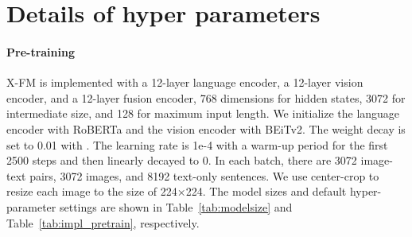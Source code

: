 \documentclass[11pt]{article}
\newcommand{\ModelNameB}{X-FM\xspace}
\begin{document}
\section{Details of hyper parameters}
\label{appendix:details_of_hyper_params}

\paragraph{Pre-training} 
{\ModelNameB} is implemented with a 12-layer language encoder, a 12-layer vision encoder, and a 12-layer fusion encoder, 768 dimensions for hidden states, 3072 for intermediate size, and 128 for maximum input length.
We initialize the language encoder with RoBERTa and the vision encoder with BEiTv2.
The weight decay is set to 0.01 with .
The learning rate is 1e-4 with a warm-up period for the first 2500 steps and then linearly decayed to 0.
In each batch, there are 3072 image-text pairs, 3072 images, and 8192 text-only sentences.
We use center-crop to resize each image to the size of 224×224. The model sizes and default hyper-parameter settings are shown in Table~\ref{tab:modelsize} and Table~\ref{tab:impl_pretrain}, respectively.

\begin{table}[ht]
\centering
{}
\caption{Pre-training setting.}
\label{tab:impl_pretrain} 
\end{table}
\end{document}
